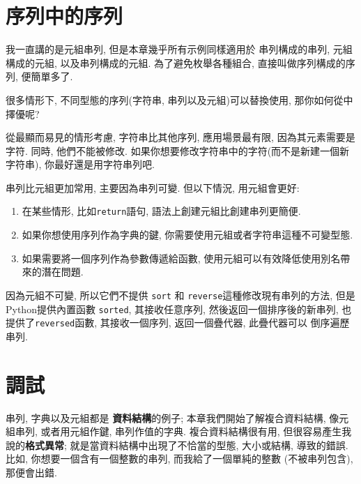 \documentclass[10pt]{book}
\begin{document}
\section{序列中的序列}

我一直講的是元組串列, 但是本章幾乎所有示例同樣適用於
串列構成的串列, 元組構成的元組, 以及串列構成的元組. 
為了避免枚舉各種組合, 直接叫做序列構成的序列, 便簡單多了. 

很多情形下, 不同型態的序列(字符串, 串列以及元組)可以替換使用, 
那你如何從中擇優呢?

從最顯而易見的情形考慮, 字符串比其他序列, 應用場景最有限, 
因為其元素需要是字符. 
同時, 他們不能被修改. 
如果你想要修改字符串中的字符(而不是新建一個新字符串), 
你最好還是用字符串列吧. 

串列比元組更加常用, 主要因為串列可變. 
但以下情況, 用元組會更好:

\begin{enumerate}

\item 在某些情形, 比如{\tt return}語句, 語法上創建元組比創建串列更簡便. 

\item 如果你想使用序列作為字典的鍵, 
你需要使用元組或者字符串這種不可變型態. 

\item 如果需要將一個序列作為參數傳遞給函數, 
使用元組可以有效降低使用別名帶來的潛在問題. 

\end{enumerate}

因為元組不可變, 所以它們不提供 {\tt sort} 和 {\tt reverse}這種修改現有串列的方法, 
但是Python提供內置函數 {\tt sorted}, 其接收任意序列, 然後返回一個排序後的新串列, 
也提供了{\tt reversed}函數, 其接收一個序列, 返回一個疊代器, 此疊代器可以
倒序遍歷串列. 
 


\section{調試}

串列, 字典以及元組都是 {\bf 資料結構}的例子;
本章我們開始了解複合資料結構, 像元組串列, 或者用元組作鍵, 
串列作值的字典. 
複合資料結構很有用, 但很容易產生我說的{\bf 格式異常};
就是當資料結構中出現了不恰當的型態, 大小或結構, 導致的錯誤. 
比如, 你想要一個含有一個整數的串列, 而我給了一個單純的整數
(不被串列包含), 那便會出錯. 
\end{document}
